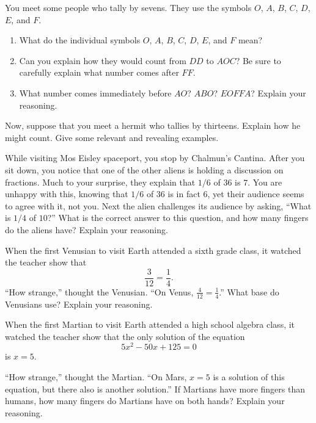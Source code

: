 \documentclass[nooutcomes]{ximera}
\begin{document}
\begin{problem}You meet some people who tally by sevens. They use the symbols
  $O$, $A$, $B$, $C$, $D$, $E$, and $F$. 
\begin{enumerate}
\item What do the individual symbols $O$, $A$, $B$, $C$, $D$, $E$, and
  $F$ mean?
\item Can you explain how they would count from $DD$ to $AOC$? Be sure
  to carefully explain what number comes after $FF$.
\item What number comes immediately before $AO$?  $ABO$? $EOFFA$?
  Explain your reasoning.
\end{enumerate}
\end{problem} 

\begin{problem}Now, suppose that you meet a hermit who tallies by
  thirteens. Explain how he might count. Give some relevant and
  revealing examples.
\end{problem} 

\begin{problem}While visiting Mos Eisley spaceport, you stop by Chalmun's
  Cantina. After you sit down, you notice that one of the other aliens
  is holding a discussion on fractions. Much to your surprise, they
  explain that $1/6$ of $36$ is $7$. You are unhappy with this,
  knowing that $1/6$ of $36$ is in fact $6$, yet their audience seems
  to agree with it, not you. Next the alien challenges its audience by
  asking, ``What is $1/4$ of $10$?'' What is the correct answer to
  this question, and how many fingers do the aliens have? Explain your
  reasoning.
\end{problem} 

\begin{problem}When the first Venusian to visit Earth attended a sixth grade
  class, it watched the teacher show that
\[
\frac{3}{12} = \frac{1}{4}.
\]
``How strange,'' thought the Venusian. ``On Venus, $\frac{4}{12} =
\frac{1}{4}$.'' What base do Venusians use? Explain your reasoning.
\end{problem} \begin{problem}When the first Martian to visit Earth attended a high school
  algebra class, it watched the teacher show that the only solution of
  the equation
\[
5x^2-50x+125 = 0
\]
is $x = 5$.

``How strange,'' thought the Martian. ``On Mars, $x = 5$ is a solution
of this equation, but there also is another solution.'' If Martians
have more fingers than humans, how many fingers do Martians have on both hands?
Explain your reasoning.


\end{problem} 
\end{document}
